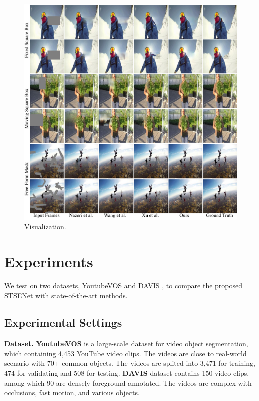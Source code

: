 \begin{figure}[t]
	\centering
	\includegraphics[width=1.5\columnwidth]{viszong} %
	\caption{Visualization.}
	\label{viszong}
\end{figure}


\section{Experiments}
We test on two datasets, YoutubeVOS \cite{xu2018youtube} and DAVIS \cite{davis_2017}, to compare the proposed STSENet with state-of-the-art methods. %
\subsection{Experimental Settings}
\textbf{Dataset.} 
\textbf{YoutubeVOS} is a large-scale dataset for video object segmentation, which containing 4,453 YouTube video clips. The videos are close to real-world scenario with 70+ common objects. The videos are splited into 3,471 for training, 474 for validating and 508 for testing.
\textbf{DAVIS} dataset contains 150 video clips, among which 90 are densely foreground annotated. The videos are complex with occlusions, fast motion, and various objects. 


